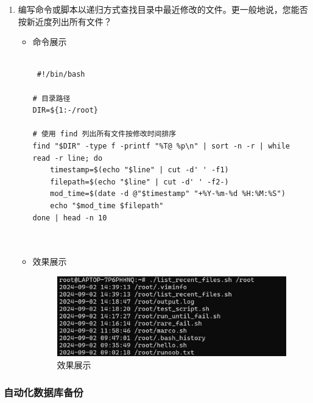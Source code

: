 \documentclass[UTF8]{ctexart}
\begin{document}
\begin{enumerate}
  \item 编写命令或脚本以递归方式查找目录中最近修改的文件。更一般地说，您能否按新近度列出所有文件？
  \begin{itemize}
  \item 命令展示
  \begin{verbatim}

 #!/bin/bash

# 目录路径
DIR=${1:-/root}

# 使用 find 列出所有文件按修改时间排序
find "$DIR" -type f -printf "%T@ %p\n" | sort -n -r | while read -r line; do
    timestamp=$(echo "$line" | cut -d' ' -f1)
    filepath=$(echo "$line" | cut -d' ' -f2-)
    mod_time=$(date -d @"$timestamp" "+%Y-%m-%d %H:%M:%S")
    echo "$mod_time $filepath"
done | head -n 10

    
  \end{verbatim}

  \item 效果展示
  \begin{figure}[H]
    \centering
    \includegraphics[width=\textwidth]{5} %
    \caption{效果展示}
  
  \end{figure}
\end{itemize}
\end{enumerate}

\subsubsection{自动化数据库备份}
\end{document}
